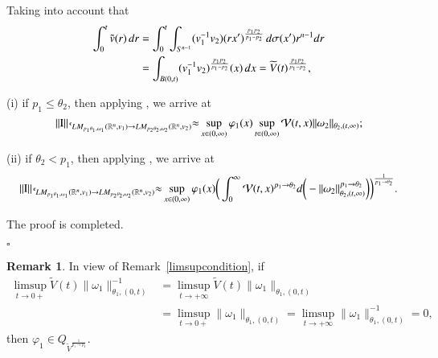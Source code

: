 \documentclass[11pt]{amsart}
\theoremstyle{plain}
\theoremstyle{definition}
\newtheorem{rem}[thm]{Remark}
\numberwithin{thm}{section}
\numberwithin{equation}{section}
\begin{document}
Taking into account that
\begin{align}
\int_0^t \tilde{v} (r)\,dr & = \int_0^t \int_{S^{n-1}} (v_1^{-1}v_2)(rx')^{\frac{p_1p_2}{p_1-p_2}}\,d\sigma(x') r^{n-1} dr \notag \\
& = \int_{B(0,t)} (v_1^{-1}v_2)^{\frac{p_1p_2}{p_1-p_2}} (x)\,dx = \widetilde V(t)^{\frac{p_1p_2}{p_1-p_2}}, \label{Vtilde}
\end{align}

\rm{(i)} if $p_1\le \theta_2$, then applying \cite[Theorem 3.2,
(i)]{gmp}, we arrive at
\begin{equation*}
\|{\operatorname{I}}\|_{{\,^{^{\bf c}}\!} LM_{p_1{\theta}_1,{\omega}_1}({{\mathbb R}^n},v_1){\rightarrow} LM_{p_2{\theta}_2,{\omega}_2}({{\mathbb R}^n},v_2)} {\approx}
\sup_{x\in (0,\infty)} {\varphi}_1(x) \sup_{t\in (0,\infty)} {\mathcal V}(t,x)
\|{\omega}_2\|_{{\theta}_2,(t,\infty)};
\end{equation*}

\rm{(ii)} if ${\theta}_2 < p_1$, then applying \cite[Theorem 3.2, (ii)]{gmp}, we arrive at
\begin{align*}
\|{\operatorname{I}}\|_{{\,^{^{\bf c}}\!} LM_{p_1{\theta}_1,{\omega}_1}({{\mathbb R}^n},v_1){\rightarrow} LM_{p_2{\theta}_2,{\omega}_2}({{\mathbb R}^n},v_2)} {\approx}
\sup_{x\in (0,\infty)} {\varphi}_1(x) \bigg(\int_0^{\infty} {\mathcal V}(t,x)^{p_1 {\rightarrow}
	{\theta}_2}  d\bigg( - \|{\omega}_2\|_{{\theta}_2,(t,\infty)}^{p_1 {\rightarrow} {\theta}_2}\bigg)
\bigg)^{\frac{1}{p_1 {\rightarrow} {\theta}_2}}.
\end{align*}

The proof is completed.

\hspace{16.9cm}$\square$

\begin{rem}
	In view of Remark~\ref{limsupcondition}, if
	\begin{align*}
	\limsup_{t{\rightarrow} 0+} \widetilde V(t) \|{\omega}_1\|_{{\theta}_1,(0,t)}^{-1} & = \limsup_{t{\rightarrow}
		+\infty} \widetilde V(t)\|{\omega}_1\|_{{\theta}_1,(0,t)} \\
	& = \limsup_{t{\rightarrow} 0+}\|{\omega}_1\|_{{\theta}_1,(0,t)} = \limsup_{t{\rightarrow} +\infty}
	\|{\omega}_1\|_{{\theta}_1,(0,t)}^{-1} = 0,
	\end{align*}
	then ${\varphi}_1 \in Q_{\widetilde V^{\frac{1}{p_1 {\rightarrow} p_2}}}$.
\end{rem}
\end{document}
